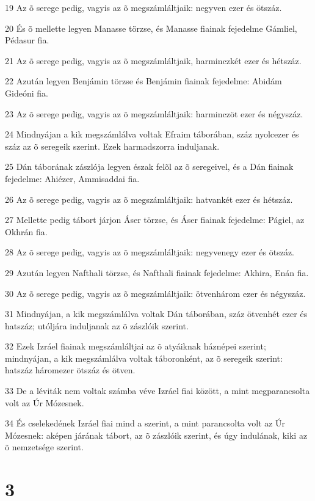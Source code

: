 \par 19 Az õ serege pedig, vagyis az õ megszámláltjaik: negyven ezer és ötszáz.
\par 20 És õ mellette legyen Manasse törzse, és Manasse fiainak fejedelme Gámliel, Pédasur fia.
\par 21 Az õ serege pedig, vagyis az õ megszámláltjaik, harminczkét ezer és hétszáz.
\par 22 Azután legyen Benjámin törzse és Benjámin fiainak fejedelme: Abidám Gideóni fia.
\par 23 Az õ serege pedig, vagyis az õ megszámláltjaik: harminczöt ezer és négyszáz.
\par 24 Mindnyájan a kik megszámlálva voltak Efraim táborában, száz nyolcezer és száz az õ seregeik szerint. Ezek harmadszorra induljanak.
\par 25 Dán táborának zászlója legyen észak felõl az õ seregeivel, és a Dán fiainak fejedelme: Ahiézer, Ammisaddai fia.
\par 26 Az õ serege pedig, vagyis az õ megszámláltjaik: hatvankét ezer és hétszáz.
\par 27 Mellette pedig tábort járjon Áser törzse, és Áser fiainak fejedelme: Págiel, az Okhrán fia.
\par 28 Az õ serege pedig, vagyis az õ megszámláltjaik: negyvenegy ezer és ötszáz.
\par 29 Azután legyen Nafthali törzse, és Nafthali fiainak fejedelme: Akhira, Enán fia.
\par 30 Az õ serege pedig, vagyis az õ megszámláltjaik: ötvenhárom ezer és négyszáz.
\par 31 Mindnyájan, a kik megszámlálva voltak Dán táborában, száz ötvenhét ezer és hatszáz; utóljára induljanak az õ zászlóik szerint.
\par 32 Ezek Izráel fiainak megszámláltjai az õ atyáiknak háznépei szerint; mindnyájan, a kik megszámlálva voltak táboronként, az õ seregeik szerint: hatszáz háromezer ötszáz és ötven.
\par 33 De a léviták nem voltak számba véve Izráel fiai között, a mint megparancsolta volt az Úr Mózesnek.
\par 34 És cselekedének Izráel fiai mind a szerint, a mint parancsolta volt az Úr Mózesnek: aképen járának tábort, az õ zászlóik szerint, és úgy indulának, kiki az õ nemzetsége szerint.

\chapter{3}

